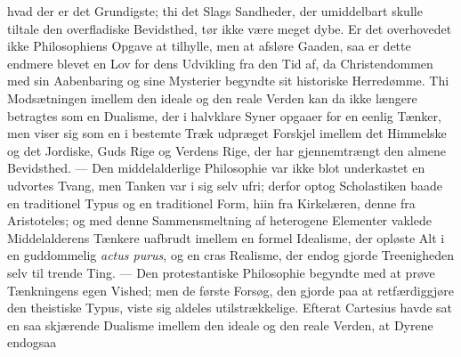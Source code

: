 \documentclass[12pt]{book}
\newcommand{\opage}[1]{\marginnote{\footnotesize\textit{[#1]}}}
\begin{document}
hvad der er det Grundigste; thi det Slags Sandheder, der umiddelbart skulle tiltale den
overfladiske Bevidsthed, tør ikke være meget dybe. Er det overhovedet ikke Philosophiens
Opgave at tilhylle, men at afsløre Gaaden, saa er dette endmere blevet en Lov for dens
Udvikling fra den Tid af, da Christendommen med sin Aabenbaring og sine Mysterier begyndte
sit historiske Herredømme. Thi Modsætningen imellem den ideale og den reale Verden kan da
ikke længere betragtes som en Dualisme, der i halvklare Syner opgaaer for en eenlig
Tænker, men viser sig som en i bestemte Træk udpræget Forskjel imellem det Himmelske og
det Jordiske, Guds Rige og Verdens Rige, der har gjennemtrængt den almene Bevidsthed. ---
Den middelalderlige Philosophie var ikke blot underkastet en udvortes Tvang, men Tanken
var i sig selv ufri; derfor optog Scholastiken baade en traditionel Typus og en traditionel
Form, hiin fra Kirkelæren, denne fra Aristoteles; og med denne Sammensmeltning af
heterogene Elementer vaklede Middelalderens Tænkere uafbrudt imellem en formel Idealisme,
der opløste Alt i en guddommelig \textit{actus purus}, og en cras Realisme, der endog
gjorde Treenigheden selv til trende Ting. --- Den protestantiske Philosophie begyndte med
at prøve Tænkningens egen Vished; men de første Forsøg, den gjorde paa at retfærdiggjøre
den
\opage{189} theistiske Typus, viste sig aldeles utilstrækkelige. Efterat Cartesius havde sat en saa
skjærende Dualisme imellem den ideale og den reale Verden, at Dyrene endogsaa
\end{document}
